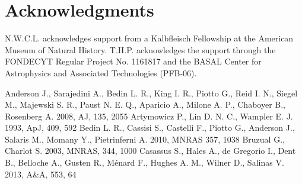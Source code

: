 \documentclass[useAMS,usenatbib]{mnras}
\begin{document}
\section{Acknowledgments}

N.W.C.L. acknowledges support from a Kalbfleisch Fellowship at the American Museum of Natural History.  T.H.P. acknowledges the support through the FONDECYT Regular Project No. 1161817 and the BASAL Center for Astrophysics and Associated Technologies (PFB-06).

\begin{thebibliography}{99}

  Anderson J.,  Sarajedini A., Bedin L. R., King I. R., Piotto G.,
  Reid I. N., Siegel M., Majewski S. R., Paust N. E. Q., Aparicio A.,
  Milone A. P., Chaboyer B., Rosenberg A. 2008, AJ, 135, 2055
 Artymowicz P., Lin D. N. C., Wampler E. J. 1993, ApJ, 409, 592 
 Bedin L. R., Cassisi S., Castelli F., Piotto G., Anderson J., Salaris M., Momany Y., Pietrinferni A. 2010, MNRAS 357, 1038
 Bruzual G., Charlot S. 2003, MNRAS, 344, 1000 
 Casassus S., Hales A., de Gregorio I., Dent B., Belloche A., G\:usten R., M\'enard F., Hughes A. M., Wilner D., Salinas V. 2013, A\&A, 553, 64 

\end{thebibliography}
\end{document}
